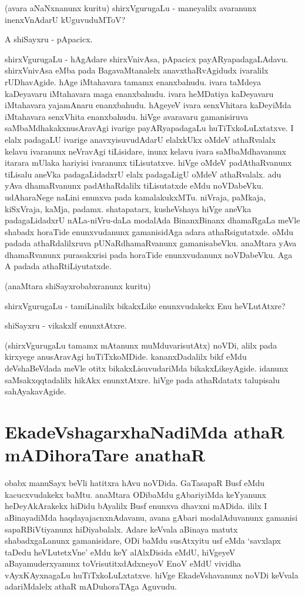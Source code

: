 (avara aNaNxnanunx kuritu) shirxVgurugaLu - maneyalilx avaranunx inenxVnAdarU kUguvuduMToV?

A shiSayxru - pApacicx.

shirxVgurugaLu - hAgAdare shirxVnivAsa, pApacicx payARyapadagaLAdavu. shirxVnivAsa eMba pada BagavaMtanalelx anavxthaRvAgidudx ivaralilx rUDhavAgide. hAge iMtahavara tamamx enanxbahudu. ivara taMdeya kaDeyavaru iMtahavara maga enanxbahudu. ivara heMDatiya kaDeyavaru iMtahavara yajamAnaru enanxbahudu. hAgeyeV ivara senxVhitara kaDeyiMda iMtahavara senxVhita enanxbahudu. hiVge avaravaru gamanisiruva saMbaMdhakakxnusAravAgi ivarige payARyapadagaLu huTiTxkoLuLxtatxve. I elalx padagaLU ivarige anavxyisuvudAdarU elalxkUkx oMdeV athaRvalalx kelavu ivaranunx neVravAgi tiLisidare, inunx kelavu ivara saMbaMdhavanunx itarara mUlaka hariyisi ivaranunx tiLisutatxve. hiVge oMdeV padAthaRvanunx tiLisalu aneVka padagaLidadxrU elalx padagaLigU oMdeV athaRvalalx. adu yAva dhamaRvanunx padAthaRdalilx tiLisutatxde eMdu noVDabeVku. udAharaNege naLini enunxva pada kamalakukxMTu. niVraja, paMkaja, kiSxVraja, kaMja, padamx. shatapatarx, kusheVshaya hiVge aneVka padagaLidadxrU nALa-niVru-daLa modalAda BinanxBinanx dhamaRgaLa meVle shabadx horaTide enunxvudanunx gamanisidAga adara athaRsigutatxde. oMdu padada athaRdalilxruva pUNaRdhamaRvanunx gamanisabeVku. anaMtara yAva dhamaRvanunx purasakxrisi pada horaTide enunxvudanunx noVDabeVku. Aga A padada athaRtiLiyutatxde.

(anaMtara shiSayxrobabxranunx kuritu)

shirxVgurugaLu - tamiLinalilx bikakxLike enunxvudakekx Enu heVLutAtxre?

shiSayxru - vikakxlf enunxtAtxre. 

(shirxVgurugaLu tamamx mAtanunx muMduvarisutAtx) noVDi, alilx pada kirxyege anusAravAgi huTiTxkoMDide. kananxDadalilx bikf eMdu deVshaBeVdada meVle otitx bikakxLisuvudariMda bikakxLikeyAgide. idanunx saMsakxqqtadalilx hikAkx‌ enunxtAtxre. hiVge pada athaRdatatx talupisalu sahAyakavAgide. 

\section*{EkadeVshagarxhaNadiMda athaR mADihoraTare anathaR}

obabx manuSayx beVli hatitxra hAvu noVDida. GaTasapaR Busf eMdu kacucxvudakekx baMtu. anaMtara ODibaMdu gAbariyiMda keYyanunx heDeyAkArakekx hiDidu bAyalilx Busf enunxva dhavxni mADida. ililx I aBinayadiMda haqdayajacnxnAdavanu, avana gAbari modalAduvanunx gamanisi sapaRBiVtiyanunx hiDiyabalalx. Adare keVvala aBinaya matutx shabadxgaLanunx gamanisidare, ODi baMdu susAtxyitu usf eMda `savxlapx taDedu heVLutetxVne' eMdu keY alAlxDisida eMdU, hiVgeyeV aBayamuderxyanunx toVrisutitxdAdxneyoV EnoV eMdU vividha vAyxKAyxnagaLu huTiTxkoLuLxtatxve. hiVge EkadeVshavanunx noVDi keVvala adariMdalelx athaR mADuhoraTAga Aguvudu. 

